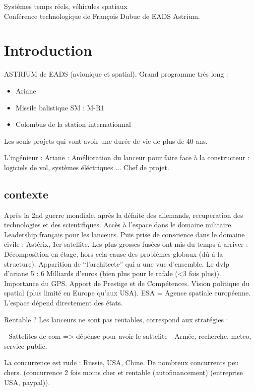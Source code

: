 \documentclass[a4paper,12pt]{article}
\begin{document}
\begin{center}
\Large{Systèmes temps réels, véhicules spatiaux}\\
\vspace{0.4cm}
\normalsize{Conférence technologique de François Dubuc de EADS Astrium.}\\
\end{center}

\section{Introduction}

ASTRIUM de EADS (avionique et spatial).
Grand programme très long :
\begin{itemize}
\item Ariane
\item Missile balistique SM : M-R1
\item Colombus de la station internationnal
\end{itemize}
Les seuls projets qui vont avoir une durée de vie de plus de 40 ans.

L'ingénieur :
Ariane : Amélioration du lanceur pour faire face à la constructeur : logiciels de vol, systèmes éléctriques ...
Chef de projet.\\

\subsection{contexte}
Après la 2nd guerre mondiale, après la défaite des allemands, recuperation des technologies et des scientifiques. Accès à l'espace dans le domaine militaire.
Leadership français pour les lanceurs.
Puis prise de conscience dans le domaine civile : Astérix, 1er satellite.
Les plus grosses fusées ont mis du temps à arriver : Décomposition en étage, hors cela cause des problèmes globaux (dû à la structure). Apparition de ``l'architecte'' qui a une vue d'ensemble.
Le dvlp d'ariane 5 : 6 Milliards d'euros (bien plus pour le rafale (<3 fois plus)).
Importance du GPS.
Apport de Prestige et de Compétences.
Vision politique du spatial (plus limité en Europe qu'aux USA).
ESA = Agence spatiale européenne.
L'espace dépend directement des états.

Rentable ? Les lanceurs ne sont pas rentables, correspond aux stratégies :

 - Sattelites de com => dépénse pour avoir le sattelite
 - Armée, recherche, meteo, service public.

La concurrence est rude : Russie, USA, Chine.
De nombreux concurrents peu chers. (concurrence 2 fois moins cher et rentable (autofinancement)  (entreprise USA, paypal)).
\end{document}
